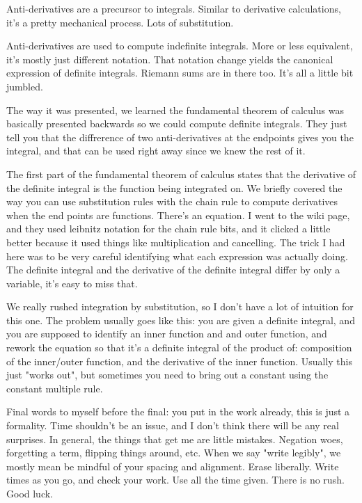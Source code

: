 Anti-derivatives are a precursor to integrals. Similar to derivative calculations, it's a pretty mechanical process. Lots of substitution.
\par

Anti-derivatives are used to compute indefinite integrals. More or less equivalent, it's mostly just different notation. That notation change yields the canonical expression of definite integrals. Riemann sums are in there too. It's all a little bit jumbled.
\par

The way it was presented, we learned the fundamental theorem of calculus was basically presented backwards so we could compute definite integrals. They just tell you that the diffrerence of two anti-derivatives at the endpoints gives you the integral, and that can be used right away since we knew the rest of it.
\par

The first part of the fundamental theorem of calculus states that the derivative of the definite integral is the function being integrated on. We briefly covered the way you can use substitution rules with the chain rule to compute derivatives when the end points are functions. There's an equation. I went to the wiki page, and they used leibnitz notation for the chain rule bits, and it clicked a little better because it used things like multiplication and cancelling. The trick I had here was to be very careful identifying what each expression was actually doing. The definite integral and the derivative of the definite integral differ by only a variable, it's easy to miss that.
\par

We really rushed integration by substitution, so I don't have a lot of intuition for this one. The problem usually goes like this: you are given a definite integral, and you are supposed to identify an inner function and and outer function, and rework the equation so that it's a definite integral of the product of: composition of the inner/outer function, and the derivative of the inner function. Usually this just "works out", but sometimes you need to bring out a constant using the constant multiple rule.
\par

Final words to myself before the final: you put in the work already, this is just a formality. Time shouldn't be an issue, and I don't think there will be any real surprises. In general, the things that get me are little mistakes. Negation woes, forgetting a term, flipping things around, etc. When we say "write legibly", we mostly mean be mindful of your spacing and alignment. Erase liberally. Write times as you go, and check your work. Use all the time given. There is no rush. Good luck.
\par

